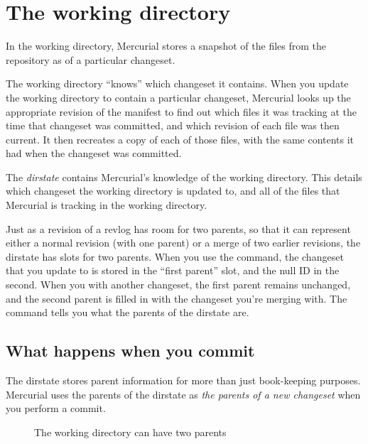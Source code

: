 \begin{figure}[ht]
  \centering
  \caption{}
  \label{fig:concepts:revlog}
\end{figure}

\section{The working directory}

In the working directory, Mercurial stores a snapshot of the files
from the repository as of a particular changeset.

The working directory ``knows'' which changeset it contains.  When you
update the working directory to contain a particular changeset,
Mercurial looks up the appropriate revision of the manifest to find
out which files it was tracking at the time that changeset was
committed, and which revision of each file was then current.  It then
recreates a copy of each of those files, with the same contents it had
when the changeset was committed.

The \emph{dirstate} contains Mercurial's knowledge of the working
directory.  This details which changeset the working directory is
updated to, and all of the files that Mercurial is tracking in the
working directory.

Just as a revision of a revlog has room for two parents, so that it
can represent either a normal revision (with one parent) or a merge of
two earlier revisions, the dirstate has slots for two parents.  When
you use the  command, the changeset that you update to
is stored in the ``first parent'' slot, and the null ID in the second.
When you  with another changeset, the first parent
remains unchanged, and the second parent is filled in with the
changeset you're merging with.  The  command tells you
what the parents of the dirstate are.

\subsection{What happens when you commit}

The dirstate stores parent information for more than just book-keeping
purposes.  Mercurial uses the parents of the dirstate as \emph{the
  parents of a new changeset} when you perform a commit.

\begin{figure}[ht]
  \centering
  \caption{The working directory can have two parents}
  \label{fig:concepts:wdir}
\end{figure}

